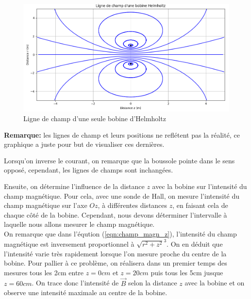 \documentclass[12pt]{article}
\begin{document}
\begin{figure}[h!]
    \begin{center}
        \includegraphics[scale=0.6]{img/LigneChamp.png}
    \end{center}
    \caption{Ligne de champ d'une seule bobine d'Helmholtz}
\end{figure}

\textbf{Remarque:} les lignes de champ et leurs positions ne reflétent pas la réalité, ce graphique a juste pour but de visualiser ces dernières.

Lorsqu'on inverse le courant, on remarque que la boussole pointe dans le sens opposé, cependant, les lignes de champs sont inchangées.

\newpage

Ensuite, on détermine l'influence de la distance $z$ avec la bobine sur l'intensité du champ magnétique. Pour cela, avec une sonde de Hall, on mesure l'intensité 
du champ magnétique sur l'axe $Oz$, à différentes distances $z$, en faisant cela de chaque côté de la bobine. Cependant, nous devons déterminer l'intervalle à laquelle nous
allons mesurer le champ magnétique. \\
On remarque que dans l'éqution (\ref{eqn:champ_magn_z}), l'intensité du champ magnétique est inversement proportionnel à $\sqrt{r^2 + z^2}^3$.
On en déduit que l'intensité varie très rapidement lorsque l'on mesure proche du centre de la bobine. Pour pallier à ce problème, on réalisera dans un premier temps 
des mesures tous les 2cm entre $z=0cm$ et $z=20cm$ puis tous les 5cm jusque $z=60cm$.
On trace donc l'intensité de $\vec{B}$ selon la distance $z$ avec la bobine et on observe une intensité maximale au centre de la bobine.
\end{document}
